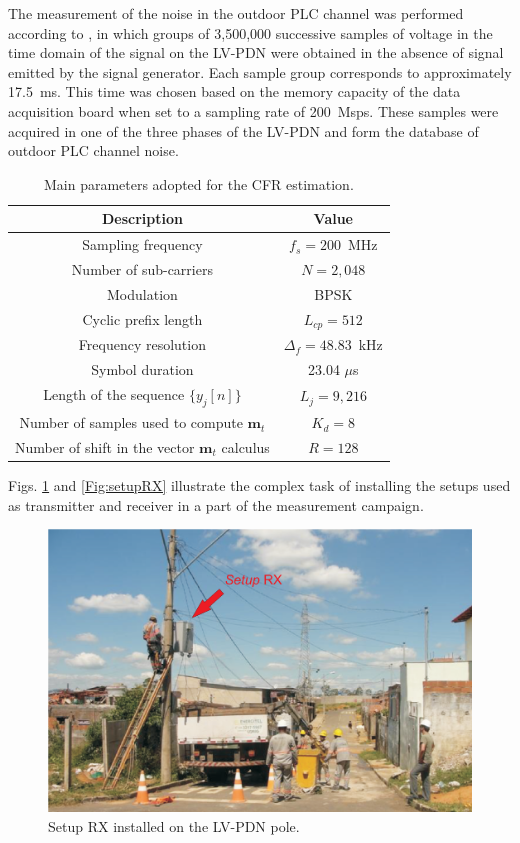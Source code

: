 \documentclass[journal]{IEEEtran}
\begin{document}
The measurement of the noise in the outdoor PLC channel was performed according to \cite{Andrade2013}, in which groups of 3,500,000 successive samples of voltage in the time domain of the signal on the \ac{LV-PDN} were obtained in the absence of signal emitted by the signal generator. Each sample group corresponds to approximately 17.5~ms. This time was chosen based on the memory capacity of the data acquisition board when set to a sampling rate of 200~Msps. These samples were acquired in one of the three phases of the \ac{LV-PDN} and form the database of outdoor PLC channel noise.

\begin{table}[!htp]
\centering
  \caption{Main parameters adopted for the CFR estimation.}
  \label{tab:setup_parameters}
\begin{tabular}{c|c}
\hline\hline
Description&Value\\
\hline\hline
Sampling frequency&$f_s=200$~MHz\\
\hline
Number of sub-carriers  &$N=2,048$ \\
\hline
Modulation         &BPSK \\
\hline
Cyclic prefix length       &$L_{cp}=512$ \\
\hline
Frequency resolution&$\Delta_f = 48.83$~kHz\\
\hline
Symbol duration & 23.04 $\mu$s \\
\hline
Length of the sequence $\{y_{j}[n]\}$    &$L_{j}=9,216$ \\
\hline
Number of samples used to compute $\textbf{m}_{t}$     &$K_{d}=8$ \\
\hline
Number of shift in the vector $\textbf{m}_{t}$  calculus       &$R=128$ \\
\hline
\end{tabular}
\end{table}


Figs. \ref{Fig:setupTX} and \ref{Fig:setupRX} illustrate the complex task of installing the setups used as transmitter and receiver in a part of the measurement campaign.
\begin{figure}[!htp]
	\begin{centering}
		\includegraphics[scale=.4]{Figuras/setupRXnoposte.eps}
		\caption{Setup RX installed on the \ac{LV-PDN} pole.}
       \label{Fig:setupTX}
     \end{centering}
 \end{figure}
 
\end{document}

